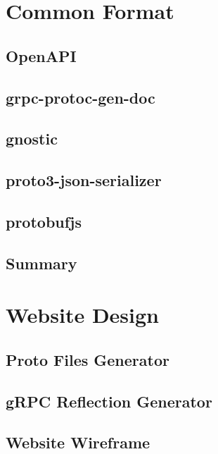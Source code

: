 \section{Common Format}

\subsection{OpenAPI}

\subsection{grpc-protoc-gen-doc}

\subsection{gnostic}

\subsection{proto3-json-serializer}

\subsection{protobufjs}

\subsection{Summary}


\section{Website Design}

\subsection{Proto Files Generator}

\subsection{gRPC Reflection Generator}

\subsection{Website Wireframe}

